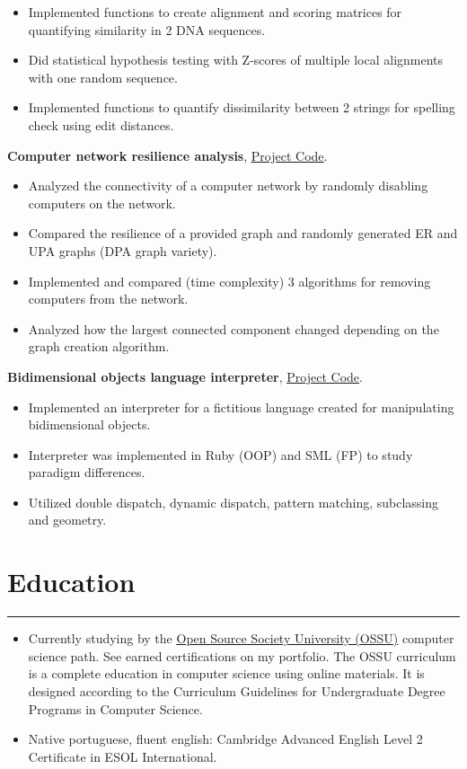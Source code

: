 \documentclass[a4paper,10pt]{article}
\newcommand{\ulink}[2]{\href{#1}{\underline{#2}}}
\begin{document}
\begin{itemize}[itemsep=0pt]
  \item Implemented functions to create alignment and scoring matrices for quantifying similarity in 2 DNA sequences.
  \item Did statistical hypothesis testing with Z-scores of multiple local alignments with one random sequence.
  \item Implemented functions to quantify dissimilarity between 2 strings for spelling check using edit distances.
\end{itemize}
\textbf{Computer network resilience analysis}, \ulink{https://github.com/rokobo/Computer-Network-Resilience-Analysis}{Project Code}.
\begin{itemize}[itemsep=0pt]
  \item Analyzed the connectivity of a computer network by randomly disabling computers on the network.
  \item Compared the resilience of a provided graph and randomly generated ER and UPA graphs (DPA graph variety).
  \item Implemented and compared (time complexity) 3 algorithms for removing computers from the network.
  \item Analyzed how the largest connected component changed depending on the graph creation algorithm.
\end{itemize}
\textbf{Bidimensional objects language interpreter}, \ulink{https://github.com/rokobo/2D-objects-language}{Project Code}.
\begin{itemize}[itemsep=0pt]
  \item Implemented an interpreter for a fictitious language created for manipulating bidimensional objects.
  \item Interpreter was implemented in Ruby (OOP) and SML (FP) to study paradigm differences.
  \item Utilized double dispatch, dynamic dispatch, pattern matching, subclassing and geometry.
\end{itemize}

\section*{Education}
\hrule
\vspace{2mm}
\begin{itemize}[itemsep=0pt]
  \item Currently studying by the
        \ulink{https://github.com/ossu/computer-science}{Open Source Society University (OSSU)}
        computer science path. See earned certifications on my portfolio. The OSSU curriculum
        is a complete education in computer science using online materials. It is designed
        according to the Curriculum Guidelines for Undergraduate Degree Programs in Computer Science.

  \item Native portuguese, fluent english: Cambridge Advanced English Level 2
        Certificate in ESOL International.
\end{itemize}
\end{document}
